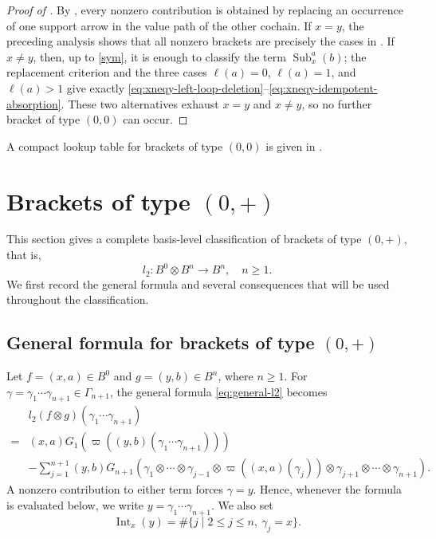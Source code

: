\documentclass[11pt,a4paper,reqno]{amsart}
\newcommand{\Sub}{\operatorname{Sub}}
\newcommand{\Int}{\operatorname{Int}}
\newcommand{\para}[2]{(#1,#2)}
\theoremstyle{plain}
\theoremstyle{definition}
\numberwithin{equation}{section}
\begin{document}
	\begin{proof}[Proof of ]
		By , every nonzero contribution is obtained by replacing an
		occurrence of one support arrow in the value path of the other cochain.  If
		$x=y$, the preceding analysis shows that all nonzero brackets are precisely
		the cases in .  If $x\neq y$, then, up to
		\eqref{sym}, it is enough to classify the term $\Sub_x^a(b)$; the
		replacement criterion  and the three cases
		$\ell(a)=0$, $\ell(a)=1$, and $\ell(a)>1$ give exactly
		\eqref{eq:xneqy-left-loop-deletion}--\eqref{eq:xneqy-idempotent-absorption}.
		These two alternatives exhaust $x=y$ and $x\neq y$, so no further bracket
		of type $(0,0)$ can occur.
	\end{proof}
	
	A compact lookup table for brackets of type $(0,0)$ is given in
	.
	\section{Brackets of type \texorpdfstring{$(0,+)$}{(0,+)}}\label{sec:mixed-classification}
	
	This section gives a complete basis-level classification of brackets of type
	$(0,+)$, that is,
	\[
	l_2:B^0\otimes B^n\longrightarrow B^n,\quad n\geq1.
	\]
	We first record the general formula and several consequences that will be used
	throughout the classification.
	
	\subsection{General formula for brackets of type \texorpdfstring{$(0,+)$}{(0,+)}}
	
	Let $f=\para{x}{a}\in B^0$ and $g=\para{y}{b}\in B^n$, where $n\ge1$.
	For
	$\gamma=\gamma_1\cdots\gamma_{n+1}\in\Gamma_{n+1}$,
	the general formula \eqref{eq:general-l2} becomes
	\begin{align*}
		&l_2(f\otimes g)(\gamma_1\cdots\gamma_{n+1}) \\
		={}&\para{x}{a}G_1(\varpi(\para{y}{b}(\gamma_1\cdots\gamma_{n+1})))\\
		&-\sum_{j=1}^{n+1}
		\para{y}{b}
		G_{n+1}(
		\gamma_1 \otimes \cdots \otimes \gamma_{j-1}
		\otimes \varpi(\para{x}{a}(\gamma_j))
		\otimes \gamma_{j+1}\otimes \cdots \otimes \gamma_{n+1}).
	\end{align*}
	A nonzero contribution to either term forces $\gamma=y$.  Hence, whenever the
	formula is evaluated below, we write
	$y=\gamma_1\cdots\gamma_{n+1}$.
	We also set
	\[\Int_x(y)=\#\{j \mid 2\le j\le n,\ \gamma_j=x\}.\]
	
\end{document}
